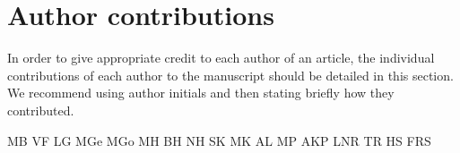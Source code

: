 \section*{Author contributions}
In order to give appropriate credit to each author of an article, the individual contributions of each author to the manuscript should be detailed in this section. We recommend using author initials and then stating briefly how they contributed.

MB
VF
LG
MGe
MGo
MH
BH
NH
SK
MK
AL
MP
AKP
LNR
TR
HS
FRS
